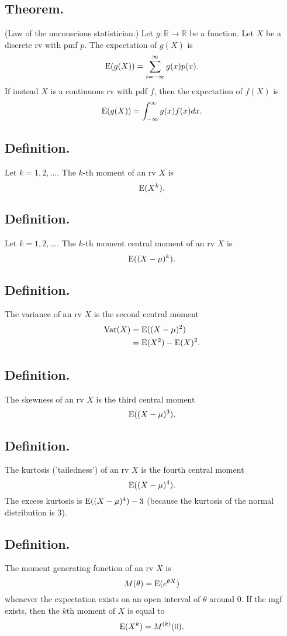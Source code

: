 \documentclass[titlepage]{article}
\begin{document}
\subsection{Theorem.} (Law of the unconscious statistician.) Let $g: \mathbb{R} \to \mathbb{R}$ be a function. Let $X$ be a discrete rv with pmf $p$. The expectation of $g(X)$ is 
$$\text{E}(g(X)) = \sum_{i=-\infty}^{\infty}g(x)p(x).$$
If instead $X$ is a continuous rv with pdf $f$, then the expectation of $f(X)$ is
$$\text{E}(g(X)) = \int_{-\infty}^{\infty}g(x)f(x)dx.$$

\subsection{Definition.} Let $k = 1, 2, \ldots$. The $k$-th moment of an rv $X$ is 
$$\text{E}(X^{k}).$$

\subsection{Definition.} Let $k = 1, 2, \ldots$. The $k$-th moment central moment of an rv $X$ is 
$$\text{E}((X-\mu)^{k}).$$

\subsection{Definition.} The variance of an rv $X$ is the second central moment 
\begin{align*}
    \text{Var}(X) &= \text{E}((X-\mu)^{2}) \\
            &= \text{E}(X^{2}) - \text{E}(X)^{2}.
\end{align*}

\subsection{Definition.} The skewness of an rv $X$ is the third central moment 
$$\text{E}((X-\mu)^{3}).$$

\subsection{Definition.} The kurtosis ('tailedness') of an rv $X$ is the fourth central moment 
$$\text{E}((X-\mu)^{4}).$$
The excess kurtosis is $\text{E}((X-\mu)^{4}) - 3$ (because the kurtosis of the normal distribution is $3$).

\subsection{Definition.} The moment generating function of an rv $X$ is 
$$M(\theta) = \text{E}(e^{\theta X})$$
whenever the expectation exists on an open interval of $\theta$ around $0$. If the mgf exists, then the $k$th moment of $X$ is equal to 
$$\text{E}(X^{k}) = M^{(k)}(0).$$
\end{document}

